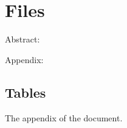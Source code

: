 \documentclass{article}
\begin{document}
\begin{abstract}
The abstract of the document.
\end{abstract}
\section{Files}
Abstract: \ownabstract

Appendix: \ownappendix
\begin{appendices}
\section{Tables}
The appendix of the document.
\end{appendices}
\end{document}
